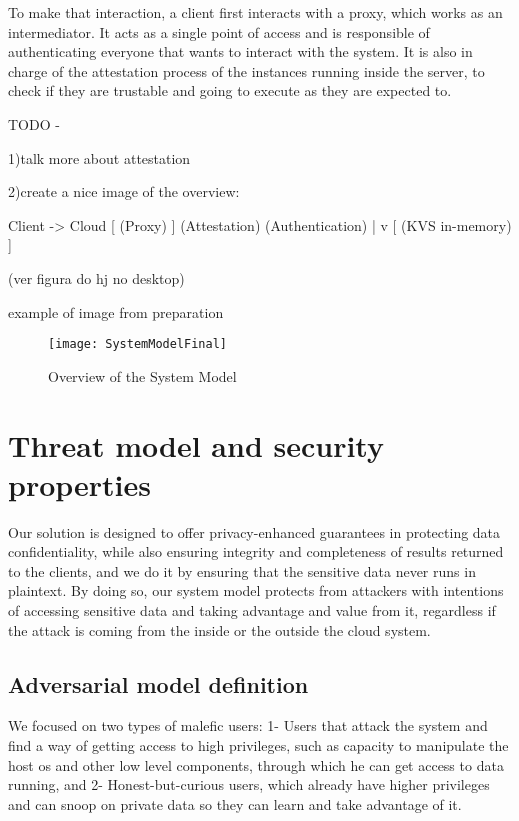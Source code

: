 To make that interaction, a client first interacts with a proxy, which works as an intermediator. It acts as a single point of access and is responsible of authenticating everyone that wants to interact with the system. It is also in charge of the attestation process of the instances running inside the server, to check if they are trustable and going to execute as they are expected to. 

TODO - 

1)talk more about attestation

2)create a nice image of the overview:

Client -> Cloud [ 	  (Proxy)		]
				    (Attestation)
				   (Authentication)
					     |
					     v
				[	(KVS in-memory)	]
				
(ver figura do hj no desktop)

example of image from preparation
\begin{figure}[htbp]
	\centering
	{\texttt{[image: SystemModelFinal]}}
	\caption{Overview of the System Model}
	\label{fig:systemModel}
\end{figure}

\section{Threat model and security properties} %
\label{sec:threatModel_and_securityProperties}

Our solution is designed to offer privacy-enhanced guarantees in protecting data confidentiality, while also ensuring integrity and completeness of results returned to the clients, and we do it by ensuring that the sensitive data never runs in plaintext. By doing so, our system model protects from attackers with intentions of accessing sensitive data and taking advantage and value from it, regardless if the attack is coming from the inside or the outside the cloud system.


\subsection{Adversarial model definition}

We focused on two types of malefic users: 1- Users that attack the system and find a way of getting access to high privileges, such as capacity to manipulate the host \gls{os} and other low level components, through which he can get access to data running, and 2-  Honest-but-curious users, which already have higher privileges and can snoop on private data so they can learn and take advantage of it.

